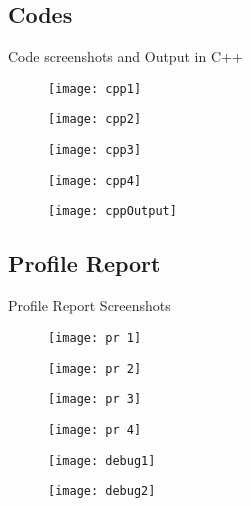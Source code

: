 \documentclass[12pt,a4paper]{article}
\begin{document}
\pagebreak
\begin{center}
\section*{\textbf{\Large Codes}}
Code screenshots and Output in C++
\begin{figure}[]
\texttt{[image: cpp1]}
\end{figure}
\begin{figure}[]
\texttt{[image: cpp2]}
\end{figure}
\begin{figure}[]
\texttt{[image: cpp3]}
\end{figure}
\begin{figure}[]
\texttt{[image: cpp4]}
\end{figure}
\begin{figure}[]
\texttt{[image: cppOutput]}
\end{figure}
\end{center}

\pagebreak
\pagebreak
\begin{center}
\section*{\textbf{\Large Profile Report}}
Profile Report Screenshots
\begin{figure}[]
\texttt{[image: pr 1]}
\end{figure}
\begin{figure}[]
\texttt{[image: pr 2]}
\end{figure}
\begin{figure}[]
\texttt{[image: pr 3]}
\end{figure}
\begin{figure}[!htb]
\texttt{[image: pr 4]}
\end{figure}
\end{center}


\begin{figure}[]
\texttt{[image: debug1]}
\end{figure}
\begin{figure}[]
\texttt{[image: debug2]}
\end{figure}
\end{document}
